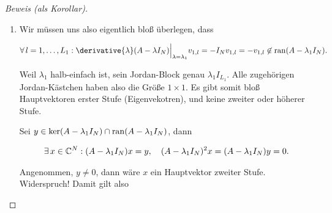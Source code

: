 \begin{proof}[Beweis (als Korollar)]
\begin{enumerate}[label = \arabic*.]
\begin{comment}
            \begin{align*}
                \implies
                (A \hat v_1, \dots, A \hat v_{L_1}, \ast)
                =
                A T
                \stackrel
                {
                    \text{JNF}
                }{=}
                T J
                =
                (\hat v_1, \dots, \hat v_{L_1}, \ast)
                \underbrace
                {
                    \begin{pmatrix}
                        J_1 & 0 \\
                        0   & \ast
                    \end{pmatrix}
                }_J
                =
                (\lambda_1 \hat v_1, \dots, \lambda_1 \hat v_{L_1}, \ast)
            \end{align*}

            Wir können die linear unabhängig $\hat v_1, \dots, v_{L_1}$ also orthonormalisieren (Gram-Schmidt) und erhalten die Orthonormalbasis $V_1 := (v_{1, 1}, \dots, v_{1, L_1})$.

        \end{comment}

        \item Wir müssen uns also eigentlich bloß überlegen, dass

        \begin{align*}
            \Forall l = 1, \dots, L_1:
                \derivative{\lambda} (A - \lambda I_N) \Big |_{\lambda = \lambda_1} v_{1, l}
                =
                -I_N v_{1, l}
                =
                -v_{1, l}
                \not \in
                \ran (A - \lambda_1 I_N).
        \end{align*}

        Weil $\lambda_1$ halb-einfach ist, sein Jordan-Block genau $\lambda_1 I_{L_1}$.
        Alle zugehörigen Jordan-Kästchen haben also die Größe $1 \times 1$.
        Es gibt somit bloß Hauptvektoren erster Stufe (Eigenvekotren), und keine zweiter oder höherer Stufe.

        Sei $y \in \ker (A - \lambda_1 I_N) \cap \operatorname{ran} (A - \lambda_1 I_N)$, dann

        \begin{align*}
            \exists \, x \in \mathbb{C}^N:
                (A - \lambda_1 I_N) x = y,
                \quad
                (A - \lambda_1 I_N)^2 x = (A - \lambda_1 I_N) y = 0.
        \end{align*}

        Angenommen, $y \neq 0$, dann wäre $x$ ein Hauptvektor zweiter Stufe.
        Widerspruch!
        Damit gilt also


\end{enumerate}
\end{proof}
